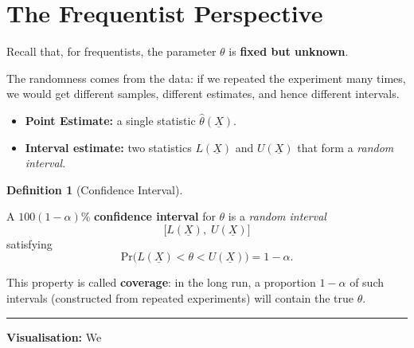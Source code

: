 \documentclass[
  letterpaper,
  DIV=11,
  numbers=noendperiod]{scrreprt}
\providecommand{\tightlist}{%
  \setlength{\itemsep}{0pt}\setlength{\parskip}{0pt}}
\theoremstyle{definition}
\theoremstyle{plain}
\theoremstyle{definition}
\newtheorem{definition}{Definition}[chapter]
\theoremstyle{remark}
\begin{document}
\section{The Frequentist Perspective}\label{the-frequentist-perspective}

Recall that, for frequentists, the parameter \(\theta\) is \textbf{fixed
but unknown}.

The randomness comes from the data: if we repeated the experiment many
times, we would get different samples, different estimates, and hence
different intervals.

\begin{itemize}
\tightlist
\item
  \textbf{Point Estimate:} a single statistic
  \(\hat{\theta}(\underline{X})\).
\item
  \textbf{Interval estimate:} two statistics \(L(\underline{X})\) and
  \(U(\underline{X})\) that form a \emph{random interval}.
\end{itemize}

\begin{definition}[Confidence
Interval]\protect\hypertarget{def-confidence-interval}{}\label{def-confidence-interval}

A \(100(1-\alpha)\%\) \textbf{confidence interval} for \(\theta\) is a
\emph{random interval} \[
\big[L(\underline{X}),\; U(\underline{X})\big]
\] satisfying \[
\mathrm{Pr} \big(L(\underline{X}) < \theta < U(\underline{X})\big) = 1 - \alpha.
\]

This property is called \textbf{coverage}: in the long run, a proportion
\(1-\alpha\) of such intervals (constructed from repeated experiments)
will contain the true \(\theta\).

\end{definition}

\begin{center}\rule{0.5\linewidth}{0.5pt}\end{center}

\textbf{Visualisation:} We
\end{document}
